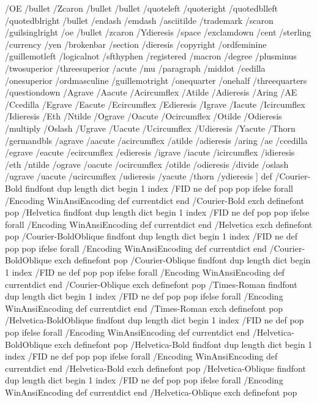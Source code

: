 /OE /bullet /Zcaron /bullet /bullet
/quoteleft /quoteright /quotedblleft /quotedblright /bullet
/endash /emdash /asciitilde /trademark /scaron
/guilsinglright /oe /bullet /zcaron /Ydieresis
/space /exclamdown /cent /sterling /currency
/yen /brokenbar /section /dieresis /copyright
/ordfeminine /guillemotleft /logicalnot /sfthyphen /registered
/macron /degree /plusminus /twosuperior /threesuperior
/acute /mu /paragraph /middot /cedilla
/onesuperior /ordmasculine /guillemotright /onequarter /onehalf
/threequarters /questiondown /Agrave /Aacute /Acircumflex
/Atilde /Adieresis /Aring /AE /Ccedilla
/Egrave /Eacute /Ecircumflex /Edieresis /Igrave
/Iacute /Icircumflex /Idieresis /Eth /Ntilde
/Ograve /Oacute /Ocircumflex /Otilde /Odieresis
/multiply /Oslash /Ugrave /Uacute /Ucircumflex
/Udieresis /Yacute /Thorn /germandbls /agrave
/aacute /acircumflex /atilde /adieresis /aring
/ae /ccedilla /egrave /eacute /ecircumflex
/edieresis /igrave /iacute /icircumflex /idieresis
/eth /ntilde /ograve /oacute /ocircumflex
/otilde /odieresis /divide /oslash /ugrave
/uacute /ucircumflex /udieresis /yacute /thorn
/ydieresis
] def
/Courier-Bold findfont
dup length dict begin
  {1 index /FID ne {def} {pop pop} ifelse} forall
  /Encoding WinAnsiEncoding def
  currentdict
end
/Courier-Bold exch definefont pop
/Helvetica findfont
dup length dict begin
  {1 index /FID ne {def} {pop pop} ifelse} forall
  /Encoding WinAnsiEncoding def
  currentdict
end
/Helvetica exch definefont pop
/Courier-BoldOblique findfont
dup length dict begin
  {1 index /FID ne {def} {pop pop} ifelse} forall
  /Encoding WinAnsiEncoding def
  currentdict
end
/Courier-BoldOblique exch definefont pop
/Courier-Oblique findfont
dup length dict begin
  {1 index /FID ne {def} {pop pop} ifelse} forall
  /Encoding WinAnsiEncoding def
  currentdict
end
/Courier-Oblique exch definefont pop
/Times-Roman findfont
dup length dict begin
  {1 index /FID ne {def} {pop pop} ifelse} forall
  /Encoding WinAnsiEncoding def
  currentdict
end
/Times-Roman exch definefont pop
/Helvetica-BoldOblique findfont
dup length dict begin
  {1 index /FID ne {def} {pop pop} ifelse} forall
  /Encoding WinAnsiEncoding def
  currentdict
end
/Helvetica-BoldOblique exch definefont pop
/Helvetica-Bold findfont
dup length dict begin
  {1 index /FID ne {def} {pop pop} ifelse} forall
  /Encoding WinAnsiEncoding def
  currentdict
end
/Helvetica-Bold exch definefont pop
/Helvetica-Oblique findfont
dup length dict begin
  {1 index /FID ne {def} {pop pop} ifelse} forall
  /Encoding WinAnsiEncoding def
  currentdict
end
/Helvetica-Oblique exch definefont pop
